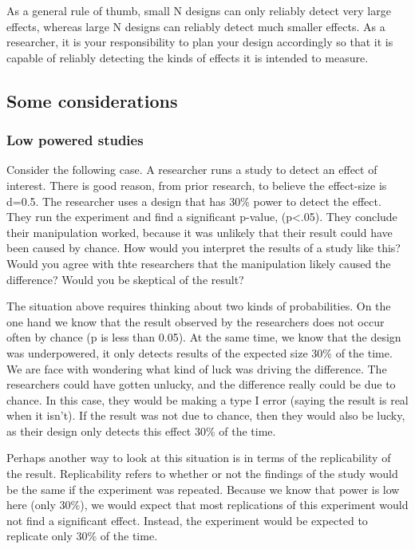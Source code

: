 \documentclass[
  letterpaper,
  DIV=11,
  numbers=noendperiod]{scrartcl}
\begin{document}
As a general rule of thumb, small N designs can only reliably detect
very large effects, whereas large N designs can reliably detect much
smaller effects. As a researcher, it is your responsibility to plan your
design accordingly so that it is capable of reliably detecting the kinds
of effects it is intended to measure.

\hypertarget{some-considerations}{%
\subsection{Some considerations}\label{some-considerations}}

\hypertarget{low-powered-studies}{%
\subsubsection{Low powered studies}\label{low-powered-studies}}

Consider the following case. A researcher runs a study to detect an
effect of interest. There is good reason, from prior research, to
believe the effect-size is d=0.5. The researcher uses a design that has
30\% power to detect the effect. They run the experiment and find a
significant p-value, (p\textless.05). They conclude their manipulation
worked, because it was unlikely that their result could have been caused
by chance. How would you interpret the results of a study like this?
Would you agree with thte researchers that the manipulation likely
caused the difference? Would you be skeptical of the result?

The situation above requires thinking about two kinds of probabilities.
On the one hand we know that the result observed by the researchers does
not occur often by chance (p is less than 0.05). At the same time, we
know that the design was underpowered, it only detects results of the
expected size 30\% of the time. We are face with wondering what kind of
luck was driving the difference. The researchers could have gotten
unlucky, and the difference really could be due to chance. In this case,
they would be making a type I error (saying the result is real when it
isn't). If the result was not due to chance, then they would also be
lucky, as their design only detects this effect 30\% of the time.

Perhaps another way to look at this situation is in terms of the
replicability of the result. Replicability refers to whether or not the
findings of the study would be the same if the experiment was repeated.
Because we know that power is low here (only 30\%), we would expect that
most replications of this experiment would not find a significant
effect. Instead, the experiment would be expected to replicate only 30\%
of the time.
\end{document}
